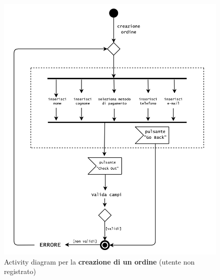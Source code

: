 \documentclass[12pt,a4paper]{article}
\begin{document}
	\newpage
	\begin{figure}[h!]
		\centering
		\includegraphics[scale=0.5]{images/ActivityDiagrams/CreazioneOrdineUtenteNonReg.png}
		\caption{Activity diagram per la \textbf{creazione di un ordine} (utente non registrato)}
	\end{figure}
	\newpage
\end{document}
